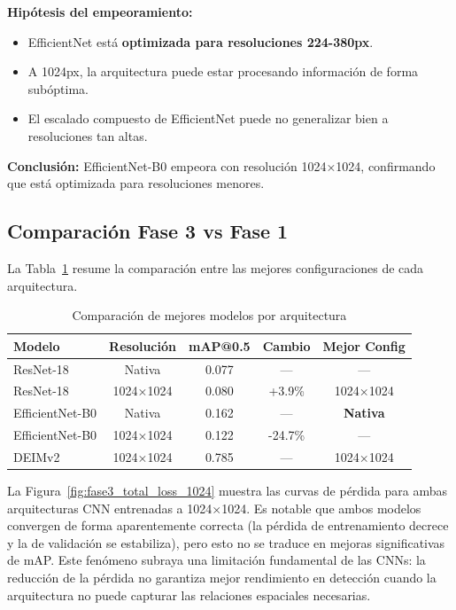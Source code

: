 \textbf{Hipótesis del empeoramiento:}
\begin{itemize}
    \item EfficientNet está \textbf{optimizada para resoluciones 224-380px}.
    \item A 1024px, la arquitectura puede estar procesando información de forma subóptima.
    \item El escalado compuesto de EfficientNet puede no generalizar bien a resoluciones tan altas.
\end{itemize}

\textbf{Conclusión:} EfficientNet-B0 empeora con resolución 1024×1024, confirmando que está optimizada para resoluciones menores.

\FloatBarrier
\subsection{Comparación Fase 3 vs Fase 1}

La Tabla~\ref{tab:comparacion_fase3} resume la comparación entre las mejores configuraciones de cada arquitectura.

\begin{table}[htbp]
\centering
\begin{tabular}{lcccc}
\toprule
\textbf{Modelo} & \textbf{Resolución} & \textbf{mAP@0.5} & \textbf{Cambio} & \textbf{Mejor Config} \\
\midrule
ResNet-18 & Nativa & 0.077 & --- & --- \\
ResNet-18 & 1024×1024 & 0.080 & +3.9\% & 1024×1024 \\
\midrule
EfficientNet-B0 & Nativa & 0.162 & --- & \textbf{Nativa} \\
EfficientNet-B0 & 1024×1024 & 0.122 & -24.7\% & --- \\
\midrule
DEIMv2 & 1024×1024 & 0.785 & --- & 1024×1024 \\
\bottomrule
\end{tabular}
\caption{Comparación de mejores modelos por arquitectura}
\label{tab:comparacion_fase3}
\end{table}

La Figura~\ref{fig:fase3_total_loss_1024} muestra las curvas de pérdida para ambas arquitecturas CNN entrenadas a 1024$\times$1024. Es notable que ambos modelos convergen de forma aparentemente correcta (la pérdida de entrenamiento decrece y la de validación se estabiliza), pero esto no se traduce en mejoras significativas de mAP. Este fenómeno subraya una limitación fundamental de las CNNs: la reducción de la pérdida no garantiza mejor rendimiento en detección cuando la arquitectura no puede capturar las relaciones espaciales necesarias.


